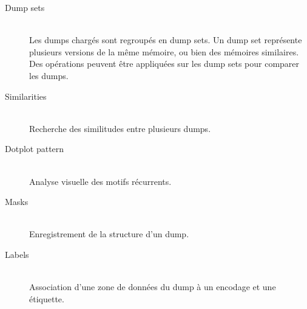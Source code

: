 \begin{description}
  \item[Dump sets] \hfill \\
  Les dumps chargés sont regroupés en dump sets. Un dump set représente plusieurs versions de la même mémoire, ou bien des mémoires similaires. Des opérations peuvent être appliquées sur les dump sets pour comparer les dumps.

  \item[Similarities] \hfill \\
  Recherche des similitudes entre plusieurs dumps.

  \item[Dotplot pattern] \hfill \\
  Analyse visuelle des motifs récurrents.

  \item[Masks] \hfill \\
  Enregistrement de la structure d'un dump.

  \item[Labels] \hfill \\
  Association d'une zone de données du dump à un encodage et une étiquette.
\end{description}
